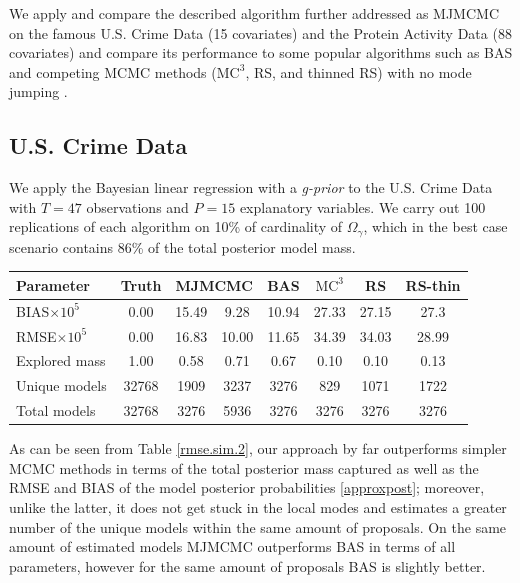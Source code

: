 \documentclass[a0,portrait]{a0poster}
\begin{document}
\begin{multicols}{2}
We apply and compare the described algorithm further addressed as MJMCMC on the famous U.S. Crime Data (15 covariates) and the Protein Activity Data (88 covariates) and compare its performance to some popular algorithms such as  BAS and competing MCMC methods ($\text{MC}^3$, RS, and thinned RS) with no mode jumping \cite{Clyde:Ghosh:Littman:2010, Hubin2016}.
\color{teal} %
\subsection*{U.S. Crime Data}
\color{DarkSlateGray} %
We apply the Bayesian linear regression with a \textit{g-prior} \cite{Clyde:Ghosh:Littman:2010} to the U.S. Crime Data with $T = 47$ observations and $P = 15$ explanatory variables. We carry out 100 replications of each algorithm on 10\% of cardinality of $\Omega_{\gamma}$, which in the best case scenario contains 86\% of the total posterior model mass.
\begin{center}\vspace{1cm} 
\begin{tabular}{ 
lccccccc}
\hline
\textbf{Parameter}&\textbf{Truth}&\multicolumn{2}{c}{\textbf{MJMCMC}}&\textbf{BAS}&\textbf{$\text{MC}^3$}&\textbf{RS}&\textbf{RS-thin}\\\hline
BIAS$\times 10^5$&0.00&15.49&9.28&10.94&27.33&27.15&27.3\\ 
RMSE$\times 10^5$&0.00&16.83&10.00&11.65&34.39&34.03&28.99\\ 
Explored mass&1.00&0.58&0.71&0.67&0.10&0.10&0.13\\ 
Unique models&32768&1909&3237&3276&829&1071&1722\\ 
Total models&32768&3276&5936&3276&3276&3276&3276\\ 
\hline
\end{tabular}
\label{rmse.sim.2}
\end{center}\vspace{1cm} 

As can be seen from Table \ref{rmse.sim.2}, our approach by far outperforms simpler MCMC methods in terms of the total posterior mass captured \cite{Clyde:Ghosh:Littman:2010,Hubin2016} as well as the RMSE and BIAS \cite{Clyde:Ghosh:Littman:2010,Hubin2016} of the model posterior probabilities \eqref{approxpost}; moreover, unlike the latter, it does not get stuck in the local modes and estimates a greater number of the unique models within the same amount of proposals. On the  same amount of estimated models MJMCMC outperforms BAS in terms of all parameters, however for the same amount of proposals BAS is slightly better. 
\color{teal} %

\end{multicols}
\end{document}
